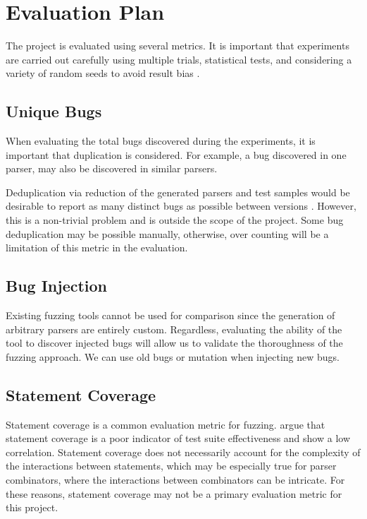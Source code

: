 \documentclass[11pt]{article}
\let\oldciteauthor\citeauthor
\renewcommand{\citeauthor}[1]{\oldciteauthor{#1} \cite{#1}}
\begin{document}
\section{Evaluation Plan}

The project is evaluated using several metrics. It is important that experiments are carried out carefully using multiple trials, statistical tests, and considering a variety of random seeds to avoid result bias \cite{evaluation}.

\subsection{Unique Bugs}

When evaluating the total bugs discovered during the experiments, it is important that duplication is considered. For example, a bug discovered in one parser, may also be discovered in similar parsers.

Deduplication via reduction of the generated parsers and test samples would be desirable to report as many distinct bugs as possible between versions \cite{deduplication}. However, this is a non-trivial problem and is outside the scope of the project. Some bug deduplication may be possible manually, otherwise, over counting will be a limitation of this metric in the evaluation.


\subsection{Bug Injection}

Existing fuzzing tools cannot be used for comparison since the generation of arbitrary parsers are entirely custom. Regardless, evaluating the ability of the tool to discover injected bugs will allow us to validate the thoroughness of the fuzzing approach. We can use old bugs or mutation when injecting new bugs.

\subsection{Statement Coverage}

Statement coverage is a common evaluation metric for fuzzing. \citeauthor{coverage} argue that statement coverage is a poor indicator of test suite effectiveness and show a low correlation. Statement coverage does not necessarily account for the complexity of the interactions between statements, which may be especially true for parser combinators, where the interactions between combinators can be intricate. For these reasons, statement coverage may not be a primary evaluation metric for this project.
\end{document}
